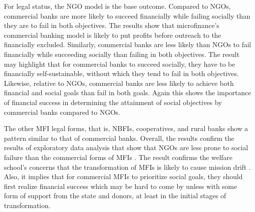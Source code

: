 \documentclass[a4paper, nobind]{templates/ociamthesis}
\begin{document}
For legal status, the NGO model is the base outcome. Compared to NGOs, commercial banks are more likely to succeed financially while failing socially than they are to fail in both objectives. The results show that microfinance's commercial banking model is likely to put profits before outreach to the financially excluded. Similarly, commercial banks are less likely than NGOs to fail financially while succeeding socially than failing in both objectives. The result may highlight that for commercial banks to succeed socially, they have to be financially self-sustainable, without which they tend to fail in both objectives. Likewise, relative to NGOs, commercial banks are less likely to achieve both financial and social goals than fail in both goals. Again this shows the importance of financial success in determining the attainment of social objectives by commercial banks compared to NGOs.

The other MFI legal forms, that is, NBFIs, cooperatives, and rural banks show a pattern similar to that of commercial banks. Overall, the results confirm the results of exploratory data analysis that show that NGOs are less prone to social failure than the commercial forms of MFIs \autocite{jia2016commercialization,mia2017mission}. The result confirms the welfare school's concerns that the transformation of MFIs is likely to cause mission drift \autocite{d2017ngos}. Also, it implies that for commercial MFIs to prioritize social goals, they should first realize financial success which may be hard to come by unless with some form of support from the state and donors, at least in the initial stages of transformation.

\newpage
\end{document}
